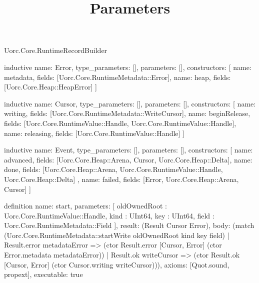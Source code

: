 \begin{lexlean}{Uorc.Core.RuntimeRecordBuilder}
\title{Parameters}
\begin{semanticmodule}
inductive{
  name: Error,
  type_parameters: [],
  parameters: [],
  constructors: [
    {name: metadata, fields: [Uorc.Core.RuntimeMetadata::Error]},
    {name: heap, fields: [Uorc.Core.Heap::HeapError]}
  ]
}

inductive{
  name: Cursor,
  type_parameters: [],
  parameters: [],
  constructors: [
    {name: writing, fields: [Uorc.Core.RuntimeMetadata::WriteCursor]},
    {name: beginRelease, fields: [Uorc.Core.RuntimeValue::Handle, Uorc.Core.RuntimeValue::Handle]},
    {name: releasing, fields: [Uorc.Core.RuntimeValue::Handle]}
  ]
}

inductive{
  name: Event,
  type_parameters: [],
  parameters: [],
  constructors: [
    {name: advanced, fields: [Uorc.Core.Heap::Arena, Cursor, Uorc.Core.Heap::Delta]},
    {
      name: done,
      fields: [Uorc.Core.Heap::Arena, Uorc.Core.RuntimeValue::Handle, Uorc.Core.Heap::Delta]
    },
    {name: failed, fields: [Error, Uorc.Core.Heap::Arena, Cursor]}
  ]
}

definition{
  name: start,
  parameters: [
    oldOwnedRoot : Uorc.Core.RuntimeValue::Handle,
    kind : UInt64,
    key : UInt64,
    field : Uorc.Core.RuntimeMetadata::Field
  ],
  result: (Result Cursor Error),
  body: (match (Uorc.Core.RuntimeMetadata::startWrite oldOwnedRoot kind key field)
    | Result.error metadataError => (ctor Result.error [Cursor, Error] (ctor Error.metadata metadataError))
    | Result.ok writeCursor => (ctor Result.ok [Cursor, Error] (ctor Cursor.writing writeCursor))),
  axioms: [Quot.sound, propext],
  executable: true
}


\end{semanticmodule}
\end{lexlean}
